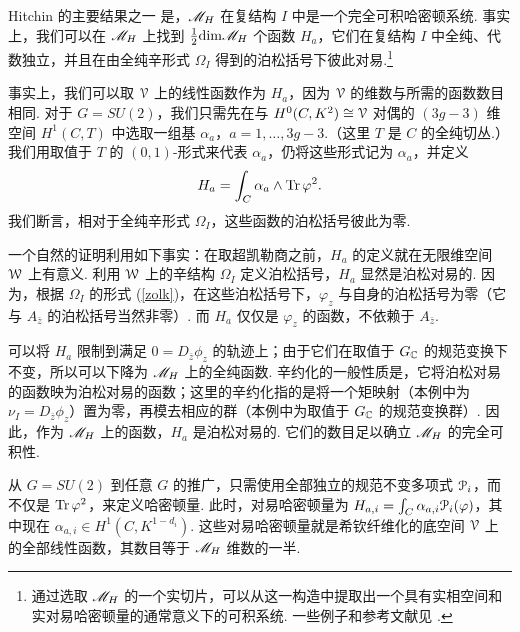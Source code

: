 Hitchin 的主要结果之一 \cite{HitchinDuke} 是，$\MH$ 在复结构 $I$ 中是一个完全可积哈密顿系统. 事实上，我们可以在 $\MH$ 上找到 ${1\over 2}{\rm dim}\MH$ 个函数 $H_a$，它们在复结构 $I$ 中全纯、代数独立，并且在由全纯辛形式 $\Omega_I$ 得到的泊松括号下彼此对易.\footnote{通过选取 $\MH$ 的一个实切片，可以从这一构造中提取出一个具有实相空间和实对易哈密顿量的通常意义下的可积系统. 一些例子和参考文献见 \cite{DonagiMarkman}.}

事实上，我们可以取 ${\cal V}$ 上的线性函数作为 $H_a$，因为 ${\cal V}$ 的维数与所需的函数数目相同. 对于 $G=SU(2)$，我们只需先在与 $H^0(C, K^2)\cong {\cal V}$ 对偶的 $(3g-3)$ 维空间 $H^1(C,T)$ 中选取一组基 $\alpha_a$，$a=1,\dots,3g-3$.（这里 $T$ 是 $C$ 的全纯切丛.）我们用取值于 $T$ 的 $(0,1)$-形式来代表 $\alpha_a$，仍将这些形式记为 $\alpha_a$，并定义
\begin{equation} \label{miro} H_a=\int_C\alpha_a \wedge
\Tr\,\varphi^2.
\end{equation}
我们断言，相对于全纯辛形式 $\Omega_I$，这些函数的泊松括号彼此为零.

一个自然的证明利用如下事实：在取超凯勒商之前，$H_a$ 的定义就在无限维空间 $\CW$ 上有意义. 利用 $\CW$ 上的辛结构 $\Omega_I$ 定义泊松括号，$H_a$ 显然是泊松对易的. 因为，根据 $\Omega_I$ 的形式 (\ref{zolk})，在这些泊松括号下，$\varphi_z$ 与自身的泊松括号为零（它与 $A_{\bar z}$ 的泊松括号当然非零）. 而 $H_a$ 仅仅是 $\varphi_z$ 的函数，不依赖于 $A_{\bar z}$.

可以将 $H_a$ 限制到满足 $0=D_{\bar z}\phi_z$ 的轨迹上；由于它们在取值于 $G_{\Bbb{C}}$ 的规范变换下不变，所以可以下降为 $\MH$ 上的全纯函数. 辛约化的一般性质是，它将泊松对易的函数映为泊松对易的函数；这里的辛约化指的是将一个矩映射（本例中为 $\nu_I=D_{\bar z}\phi_z$）置为零，再模去相应的群（本例中为取值于 $G_{\Bbb{C}}$ 的规范变换群）. 因此，作为 $\MH$ 上的函数，$H_a$ 是泊松对易的. 它们的数目足以确立 $\MH$ 的完全可积性.

从 $G=SU(2)$ 到任意 $G$ 的推广，只需使用全部独立的规范不变多项式 ${\cal P}_i$，而不仅是 $\Tr\,\varphi^2$，来定义哈密顿量. 此时，对易哈密顿量为 $H_{a,i}=\int_C\alpha_{a,i}{\cal P}_i(\varphi)$，其中现在 $\alpha_{a,i}\in H^1(C,K^{1-d_i})$. 这些对易哈密顿量就是希钦纤维化的底空间 ${\cal V}$ 上的全部线性函数，其数目等于 $\MH$ 维数的一半.

